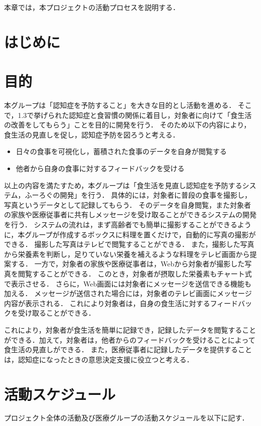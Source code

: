 \documentclass[../report]{subfiles}
\begin{document}
本章では，本プロジェクトの活動プロセスを説明する．

\section{はじめに}


\section{目的} \label{sec:objective}
本グループは「認知症を予防すること」を大きな目的とし活動を進める．
そこで，1.3で挙げられた認知症と食習慣の関係に着目し，対象者に向けて「食生活の改善をしてもらう」ことを目的に開発を行う．
そのため以下の内容により，食生活の見直しを促し，認知症予防を図ろうと考える．

\begin{itemize}
  \item 日々の食事を可視化し，蓄積された食事のデータを自身が閲覧する
  \item 他者から自身の食事に対するフィードバックを受ける
\end{itemize}

以上の内容を満たすため，本グループは「食生活を見直し認知症を予防するシステム，ふーろぐの開発」を行う．
具体的には，対象者に普段の食事を撮影し，写真というデータとして記録してもらう．
そのデータを自身閲覧，また対象者の家族や医療従事者に共有しメッセージを受け取ることができるシステムの開発を行う．
システムの流れは，まず高齢者でも簡単に撮影することができるように，本グループが作成するボックスに料理を置くだけで，自動的に写真の撮影ができる．
撮影した写真はテレビで閲覧することができる．
また，撮影した写真から栄養素を判断し，足りていない栄養を補えるような料理をテレビ画面から提案する．
一方で，対象者の家族や医療従事者は，Webから対象者が撮影した写真を閲覧することができる．
このとき，対象者が摂取した栄養素もチャート式で表示させる．
さらに，Web画面には対象者にメッセージを送信できる機能も加える．
メッセージが送信された場合には，対象者のテレビ画面にメッセージ内容が表示される．
これにより対象者は，自身の食生活に対するフィードバックを受け取ることができる．

これにより，対象者が食生活を簡単に記録でき，記録したデータを閲覧することができる．加えて，対象者は，他者からのフィードバックを受けることによって食生活の見直しができる．
また，医療従事者に記録したデータを提供することは，認知症になったときの意思決定支援に役立つと考える．


\section{活動スケジュール}
プロジェクト全体の活動及び医療グループの活動スケジュールを以下に記す．
\end{document}
